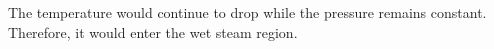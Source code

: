 The temperature would continue to drop while the pressure remains constant. Therefore, it would enter the wet steam region.